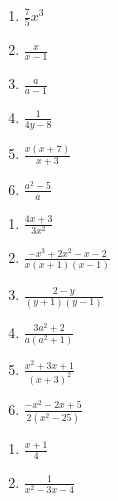 \begin{respostas}{5}
    
    \ansitem{} \begin{multicols}{3}
        \begin{enumerate}[label=\alph*)]
            \item $\frac{7}{5}x^3$
            
            \item $\frac{x}{x -1}$
            
            \item $\frac{a}{a-1}$
            
            \item $\frac{1}{4y-8}$
            
            \item $\frac{x(x+7)}{x+3}$
            
            \item $\frac{a^2-5}{a}$
        \end{enumerate}
    \end{multicols}
    
    \ansitem{} \begin{multicols}{3}
        \begin{enumerate}[label=\alph*)]
            \item $\frac{4x+3}{3x^2}$
            
            \item $\frac{-x^3+2x^2-x-2}{x(x+1)(x-1)}$
            
            \item $\frac{2-y}{(y+1)(y-1)}$
            
            \item $\frac{3a^2+2}{a(a^2+1)}$
            
            \item $\frac{x^2+3x+1}{(x+3)^2}$
            
            \item $\frac{-x^2-2x+5}{2(x^2-25)}$
        \end{enumerate}
    \end{multicols}
    
    \ansitem{} \begin{multicols}{3}
        \begin{enumerate}[label=\alph*)]
            \item $\frac{x+1}{4}$
            
            \item $\frac{1}{x^2-3x-4}$
            

\end{enumerate}
\end{multicols}
\end{respostas}
